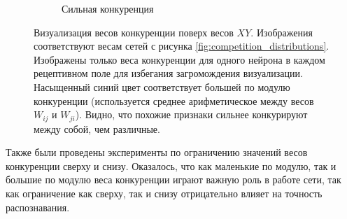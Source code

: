 \documentclass[a4paper]{article}
\begin{document}
\begin{figure}[H]
\begin{subfigure}{0.45\textwidth}
    \caption{Сильная конкуренция}
\end{subfigure}
\caption{Визуализация весов конкуренции поверх весов $XY$. Изображения соответствуют весам сетей с рисунка \ref{fig:competition_distributions}. Изображены только веса конкуренции для одного нейрона в каждом рецептивном поле для избегания загромождения визуализации. Насыщенный синий цвет соответствует большей по модулю конкуренции (используется среднее арифметическое между весов $W_{ij}$ и $W_{ji}$). Видно, что похожие признаки сильнее конкурируют между собой, чем различные.}
\end{figure}

Также были проведены эксперименты по ограничению значений весов конкуренции сверху и снизу. Оказалось, что как маленькие по модулю, так и большие по модулю веса конкуренции играют важную роль в работе сети, так как ограничение как сверху, так и снизу отрицательно влияет на точность распознавания.
\end{document}

